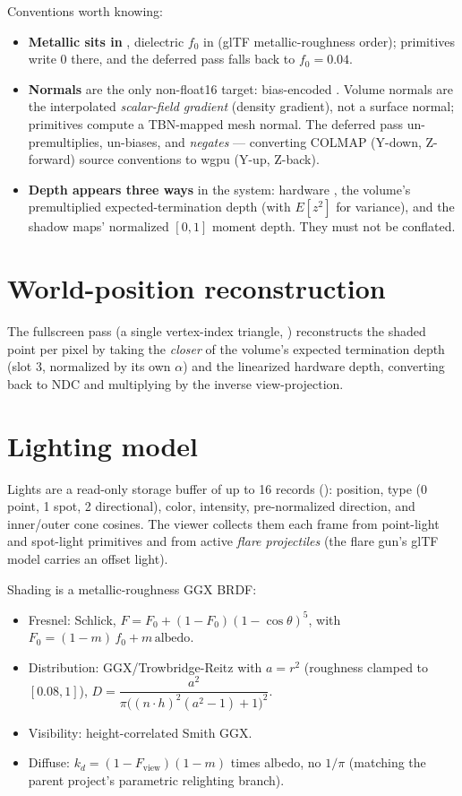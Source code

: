 Conventions worth knowing:
\begin{itemize}
\item \textbf{Metallic sits in }, dielectric $f_0$ in
   (glTF metallic-roughness order); primitives write 0 there,
  and the deferred pass falls back to $f_0 = 0.04$.
\item \textbf{Normals} are the only non-float16 target: bias-encoded
  . Volume normals are the interpolated \emph{scalar-field
  gradient} (density gradient), not a surface normal; primitives compute a
  TBN-mapped mesh normal. The deferred pass un-premultiplies, un-biases, and
  \emph{negates} --- converting COLMAP (Y-down, Z-forward) source
  conventions to wgpu (Y-up, Z-back).
\item \textbf{Depth appears three ways} in the system: hardware
  , the volume's premultiplied expected-termination depth
  (with $E[z^2]$ for variance), and the shadow maps' normalized $[0,1]$
  moment depth. They must not be conflated.
\end{itemize}

\section{World-position reconstruction}

The fullscreen pass (a single vertex-index triangle, )
reconstructs the shaded point per pixel by taking the \emph{closer} of the
volume's expected termination depth (slot 3, normalized by its own $\alpha$)
and the linearized hardware depth, converting back to NDC and multiplying by
the inverse view-projection.

\section{Lighting model}

Lights are a read-only storage buffer of up to 16  records
(): position, type (0 point, 1 spot, 2
directional), color, intensity, pre-normalized direction, and inner/outer
cone cosines. The viewer collects them each frame from point-light and
spot-light primitives and from active \emph{flare projectiles} (the flare
gun's glTF model carries an offset light).

Shading is a metallic-roughness GGX BRDF:
\begin{itemize}
\item Fresnel: Schlick, $F = F_0 + (1-F_0)(1-\cos\theta)^5$, with
  $F_0 = (1-m)\,f_0 + m\,\text{albedo}$.
\item Distribution: GGX/Trowbridge-Reitz with $a = r^2$
  (roughness clamped to $[0.08, 1]$),
  $D = \dfrac{a^2}{\pi\big((n \cdot h)^2 (a^2 - 1) + 1\big)^2}$.
\item Visibility: height-correlated Smith GGX.
\item Diffuse: $k_d = (1 - F_{\text{view}})(1 - m)$ times albedo, no
  $1/\pi$ (matching the parent project's parametric relighting branch).
\end{itemize}

